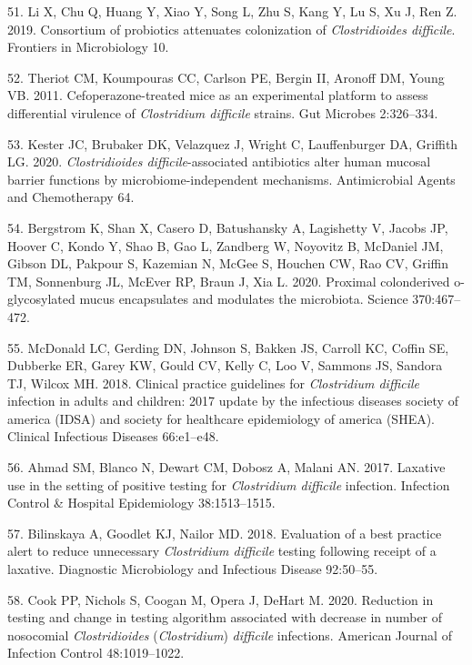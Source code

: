 \documentclass[
  11pt,
]{article}
\begin{document}
\leavevmode\hypertarget{ref-Li2019}{}%
51. Li X, Chu Q, Huang Y, Xiao Y, Song L, Zhu S, Kang Y, Lu S, Xu J, Ren
Z. 2019. Consortium of probiotics attenuates colonization of
\emph{Clostridioides difficile}. Frontiers in Microbiology 10.

\leavevmode\hypertarget{ref-Theriot2011}{}%
52. Theriot CM, Koumpouras CC, Carlson PE, Bergin II, Aronoff DM, Young
VB. 2011. Cefoperazone-treated mice as an experimental platform to
assess differential virulence of \emph{Clostridium difficile} strains.
Gut Microbes 2:326--334.

\leavevmode\hypertarget{ref-Kester2020}{}%
53. Kester JC, Brubaker DK, Velazquez J, Wright C, Lauffenburger DA,
Griffith LG. 2020. \emph{Clostridioides difficile}-associated
antibiotics alter human mucosal barrier functions by
microbiome-independent mechanisms. Antimicrobial Agents and Chemotherapy
64.

\leavevmode\hypertarget{ref-Bergstrom2020}{}%
54. Bergstrom K, Shan X, Casero D, Batushansky A, Lagishetty V, Jacobs
JP, Hoover C, Kondo Y, Shao B, Gao L, Zandberg W, Noyovitz B, McDaniel
JM, Gibson DL, Pakpour S, Kazemian N, McGee S, Houchen CW, Rao CV,
Griffin TM, Sonnenburg JL, McEver RP, Braun J, Xia L. 2020. Proximal
colonderived o-glycosylated mucus encapsulates and modulates the
microbiota. Science 370:467--472.

\leavevmode\hypertarget{ref-McDonald2018b}{}%
55. McDonald LC, Gerding DN, Johnson S, Bakken JS, Carroll KC, Coffin
SE, Dubberke ER, Garey KW, Gould CV, Kelly C, Loo V, Sammons JS, Sandora
TJ, Wilcox MH. 2018. Clinical practice guidelines for \emph{Clostridium
difficile} infection in adults and children: 2017 update by the
infectious diseases society of america (IDSA) and society for healthcare
epidemiology of america (SHEA). Clinical Infectious Diseases 66:e1--e48.

\leavevmode\hypertarget{ref-Ahmad2017}{}%
56. Ahmad SM, Blanco N, Dewart CM, Dobosz A, Malani AN. 2017. Laxative
use in the setting of positive testing for \emph{Clostridium difficile}
infection. Infection Control \& Hospital Epidemiology 38:1513--1515.

\leavevmode\hypertarget{ref-Bilinskaya2018}{}%
57. Bilinskaya A, Goodlet KJ, Nailor MD. 2018. Evaluation of a best
practice alert to reduce unnecessary \emph{Clostridium difficile}
testing following receipt of a laxative. Diagnostic Microbiology and
Infectious Disease 92:50--55.

\leavevmode\hypertarget{ref-Cook2020}{}%
58. Cook PP, Nichols S, Coogan M, Opera J, DeHart M. 2020. Reduction in
testing and change in testing algorithm associated with decrease in
number of nosocomial \emph{Clostridioides} (\emph{Clostridium})
\emph{difficile} infections. American Journal of Infection Control
48:1019--1022.
\end{document}
